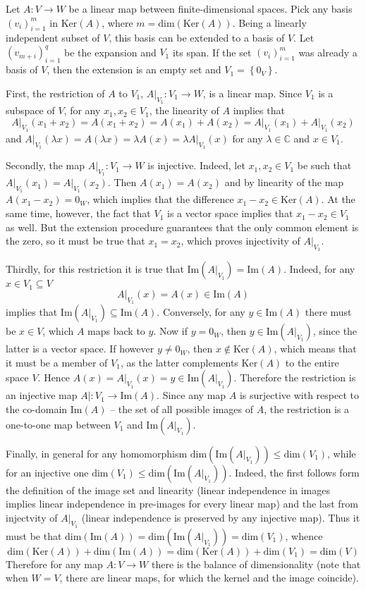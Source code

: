 \documentclass[a4paper]{article}
\newcommand{\obj}[1]{\ensuremath{\left\{ #1 \right\}}}
\newcommand{\brac}[1]{\ensuremath{\left( #1 \right)}}
\newcommand{\Dim}[1]{\ensuremath{\text{dim}\brac{ #1 }}}
\newcommand{\Ker}[1]{\ensuremath{\text{Ker}\brac{ #1 }}}
\newcommand{\im}[1]{\ensuremath{\text{Im}\brac{ #1 }}}
\begin{document}
Let $A:V\to W$ be a linear map between finite-dimensional spaces. Pick any basis $\brac{v_i}_{i=1}^m$ in $\Ker{A}$, where $m = \Dim{\Ker{A}}$. Being a linearly independent subset of $V$, this basis can be extended to a basis of $V$. Let $\brac{v_{m+i}}_{i=1}^q$ be the expansion and $V_1$ its span. If the set $\brac{v_i}_{i=1}^m$ was already a basis of $V$, then the extension is an empty set and $V_1 = \obj{0_V}$.

First, the restriction of $A$ to $V_1$, $A\vert_{V_1}:V_1\to W$, is a linear map. Since $V_1$ is a subspace of $V$, for any $x_1, x_2\in V_1$, the linearity of $A$ implies that\[A\vert_{V_1}\brac{x_1+x_2} = A\brac{x_1+x_2} = A\brac{x_1}+A\brac{x_2} = A\vert_{V_1}\brac{x_1}+A\vert_{V_1}\brac{x_2}\] and $A\vert_{V_1}\brac{\lambda x} = A\brac{\lambda x} = \lambda A\brac{x} = \lambda A\vert_{V_1}\brac{x}$ for any $\lambda \in \mathbb{C}$ and $x \in V_1$.

Secondly, the map $A\vert_{V_1}:V_1\to W$ is injective. Indeed, let $x_1, x_2\in V_1$ be such that $A\vert_{V_1}\brac{x_1}=A\vert_{V_1}\brac{x_2}$. Then $A\brac{x_1}=A\brac{x_2}$ and by linearity of the map $A\brac{x_1-x_2} = 0_W$, which implies that the difference $x_1-x_2\in \Ker{A}$. At the same time, however, the fact that $V_1$ is a vector space implies that $x_1-x_2\in V_1$ as well. But the extension procedure guarantees that the only common element is the zero, so it must be true that $x_1 = x_2$, which proves injectivity of $A\vert_{V_1}$.

Thirdly, for this restriction it is true that $\im{A\vert_{V_1}} = \im{A}$. Indeed, for any $x\in V_1\subseteq V$ \[A\vert_{V_1}\brac{x} = A\brac{x}\in \im{A}\] implies that $\im{A\vert_{V_1}} \subseteq \im{A}$. Conversely, for any $y\in \im{A}$ there must be $x\in V$, which $A$ maps back to $y$. Now if $y = 0_W$, then $y\in \im{A\vert_{V_1}}$, since the latter is a vector space. If however $y\neq 0_W$, then $x\not\in\Ker{A}$, which means that it must be a member of $V_1$, as the latter complements $\Ker{A}$ to the entire space $V$. Hence $A\brac{x}=A\vert_{V_1}\brac{x} = y \in \im{A\vert_{V_1}}$. Therefore the restriction is an injective map $A\vert:V_1\to \im{A}$. Since any map $A$ is surjective with respect to the co-domain $\im{A}$ -- the set of all possible images of $A$, the restriction is a one-to-one map between $V_1$ and $\im{A\vert_{V_1}}$.

Finally, in general for any homomorphism $\Dim{\im{A\vert_{V_1}}}\leq \Dim{V_1}$, while for an injective one $\Dim{V_1}\leq \Dim{\im{A\vert_{V_1}}}$. Indeed, the first follows form the definition of the image set and linearity (linear independence in images implies linear independence in pre-images for every linear map) and the last from injectvity of $A\vert_{V_1}$ (linear independence is preserved by any injective map). Thus it must be that $\Dim{\im{A}} = \Dim{\im{A\vert_{V_1}}} = \Dim{V_1}$, whence \[\Dim{\Ker{A}} + \Dim{\im{A}} = \Dim{\Ker{A}} + \Dim{V_1} = \Dim{V}\] Therefore for any map $A:V\to W$ there is the balance of dimensionality (note that when $W = V$, there are linear maps, for which the kernel and the image coincide).
\end{document}

